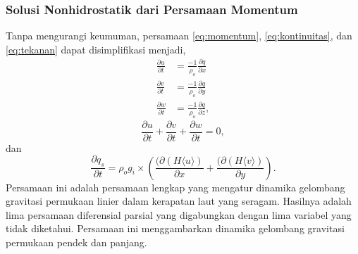 \begin{spacing}{1.5}
\subsubsection[Solusi Nonhidrostatik dari Persamaan Momentum]{Solusi Nonhidrostatik dari Persamaan Momentum}
	Tanpa mengurangi keumuman, persamaan \ref{eq:momentum}, \ref{eq:kontinuitas}, dan \ref{eq:tekanan} dapat disimplifikasi menjadi,
	\begin{equation}\label{eq:momentumS}
		\begin{aligned}
			\frac{\partial u}{\partial t} &= \frac{-1}{\rho_o}\frac{\partial q}{\partial x} \\
			\frac{\partial v}{\partial t} &= \frac{-1}{\rho_o}\frac{\partial q}{\partial y} \\
			\frac{\partial w}{\partial t} &= \frac{-1}{\rho_o}\frac{\partial q}{\partial z},
		\end{aligned}
	\end{equation}
	\begin{equation}\label{eq:kontinuitasS}
		\frac{\partial u}{\partial t} + \frac{\partial v}{\partial t} + \frac{\partial w}{\partial t} = 0, 
	\end{equation}
	dan
	\begin{equation}\label{tekananS}
		\frac{\partial q_s}{\partial t} = \rho_o g_i \times \left( \frac{(\partial \left(H \langle u \rangle \right)} {\partial x} + \frac{(\partial \left(H \langle v \rangle \right)} {\partial y}\right).
	\end{equation}
	Persamaan ini adalah persamaan lengkap yang mengatur dinamika gelombang gravitasi permukaan linier dalam kerapatan laut yang seragam. Hasilnya adalah lima persamaan diferensial parsial yang digabungkan dengan lima variabel yang tidak diketahui. Persamaan ini menggambarkan dinamika gelombang gravitasi permukaan pendek dan panjang.
	

\end{spacing}
